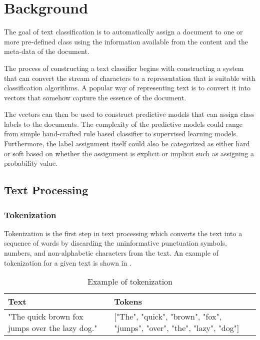\chapter{Background} \label{background}
The goal of text classification is to automatically assign a document to one or more pre-defined class using the information available from the content and the meta-data of the document.

The process of constructing a text classifier begins with constructing a system that can convert the stream of characters to a representation that is suitable with classification algorithms. A popular way of representing text is to convert it into vectors that somehow capture the essence of the document. 

The vectors can then be used to construct predictive models that can assign class labels to the documents. The complexity of the predictive models could range from simple hand-crafted rule based classifier to supervised learning models. Furthermore, the label assignment itself could also be categorized as either hard or soft based on whether the assignment is explicit or implicit such as assigning a probability value. 

\section{Text Processing}
\subsection{Tokenization}
Tokenization is the first step in text processing which converts the text into a sequence of words by discarding the uninformative punctuation symbols, numbers, and non-alphabetic characters from the text. An example of tokenization for a given text is shown in .

\begin{table}[h]
\begin{center}
\caption{Example of tokenization}
\label{tbl:tokenization_example}
\begin{tabular}{p{6cm}p{6cm}}
\toprule 
Text&Tokens\\
\midrule 
"The quick brown fox jumps over the lazy dog."&["The", "quick", "brown", "fox", "jumps", "over", "the", "lazy", "dog"]\\
\bottomrule
\end{tabular}
\end{center}
\end{table}

